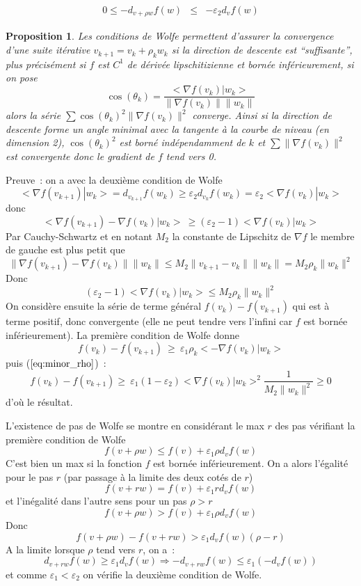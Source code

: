 \documentclass[a4paper,11pt]{article}
\newtheorem{prop}[thm]{Proposition}
\begin{document}
\begin{giacjshere}
\begin{itemize}
\begin{eqnarray*}
0 \leq -d_{v+\rho w}f(w) &\leq& -\varepsilon_2 d_vf(w)
\end{eqnarray*}
\end{itemize}
\begin{prop}
Les conditions de Wolfe permettent d'assurer la convergence d'une
suite it\'erative $v_{k+1}=v_k+\rho_k w_k$ si la direction de descente
est ``suffisante'', plus pr\'ecis\'ement si $f$ est $C^1$ de d\'eriv\'ee
lipschitizienne et born\'ee inf\'erieurement, si on pose
$$ \cos(\theta_k)=\frac{<\nabla f(v_k)|w_k>}{\| \nabla f(v_k)\| \|w_k\|}$$
alors la s\'erie
$ \sum \cos(\theta_k)^2 \| \nabla f(v_k)\|^2 $ converge.
Ainsi si la direction de descente forme un angle minimal avec la
tangente \`a la courbe de niveau (en dimension 2), $\cos(\theta_k)^2$
est born\'e ind\'ependamment de $k$ et $\sum \|  \nabla f(v_k)\|^2$
est convergente donc le gradient de $f$ tend vers 0.
\end{prop}
Preuve~: on a avec la deuxi\`eme condition de Wolfe
$$ <\nabla f(v_{k+1})|w_k>=d_{v_{k+1}}f(w_k) 
\geq \varepsilon_2 d_{v_k}f(w_k)= \varepsilon_2<\nabla f(v_k)|w_k>$$
donc
$$ <\nabla f(v_{k+1})-\nabla f(v_k)|w_k> \ \geq (\varepsilon_2-1) <\nabla f(v_k)|w_k>$$
Par Cauchy-Schwartz et en notant $M_2$ la constante de Lipschitz de $\nabla f$
le membre de gauche est plus petit que 
$$ \| \nabla f(v_{k+1})-\nabla f(v_k) \| \| w_k \| \leq 
M_2\|v_{k+1}-v_k\| \| w_k\| = M_2 \rho_k \| w_k \|^2$$
Donc
\begin{equation} \label{eq:minor_rho}
 (\varepsilon_2-1)<\nabla f(v_k)|w_k> \leq M_2 \rho_k \| w_k \|^2
\end{equation}
On consid\`ere ensuite la s\'erie de terme g\'en\'eral
$f(v_{k})-f(v_{k+1})$  qui est \`a terme positif, donc convergente
(elle ne peut tendre vers l'infini car $f$ est born\'ee
inf\'erieurement).
La premi\`ere condition de Wolfe donne
$$ f(v_{k})-f(v_{k+1})  \ \geq  \ \varepsilon_1 \rho_k <-\nabla
f(v_k)|w_k> $$
puis (\(\ref{eq:minor_rho}\))~:
$$ f(v_{k})-f(v_{k+1})  \geq \ 
\varepsilon_1  (1-\varepsilon_2)<\nabla f(v_k)|w_k>^2\frac{1}{M_2  \|  w_k \|^2} 
 \geq 0 $$
d'o\`u le r\'esultat.

L'existence de pas de Wolfe se montre en consid\'erant le max $r$ des
pas v\'erifiant la premi\`ere condition de Wolfe
$$f(v+\rho w) \leq f(v) +\varepsilon_1 \rho d_vf(w) $$
C'est bien un max si la fonction
$f$ est born\'ee inf\'erieurement. On a alors l'\'egalit\'e pour le pas
$r$ (par passage \`a la limite des deux cot\'es de $r$)
$$f(v+r w) = f(v) +\varepsilon_1 r d_vf(w) $$
et l'in\'egalit\'e dans l'autre sens pour un pas $\rho>r$
$$f(v+\rho w) > f(v) +\varepsilon_1 \rho d_vf(w) $$
Donc
$$ f(v+\rho w)-f(v+r w) > \varepsilon_1 d_vf(w) (\rho -r)$$
A la limite lorsque $\rho$ tend vers $r$, on a~:
$$ d_{v+rw}f(w) \geq \varepsilon_1 d_vf(w) \Rightarrow -d_{v+rw}f(w) \leq \varepsilon_1 (-d_vf(w))$$
et comme $\varepsilon_1<\varepsilon_2$ on v\'erifie la deuxi\`eme
condition de Wolfe.


\end{giacjshere}
\end{document}
